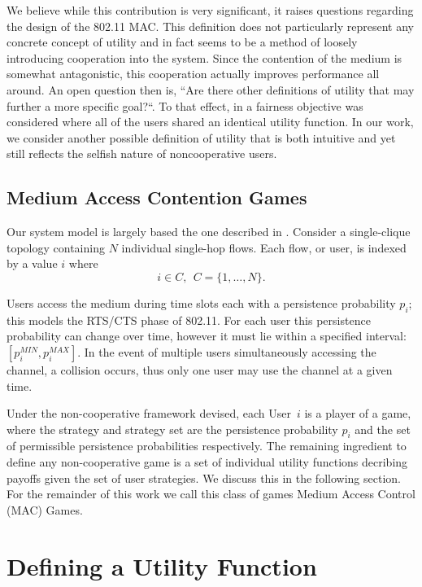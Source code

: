 \documentclass[conference]{IEEEtran}
\theoremstyle{definition}
\begin{document}
We believe while this contribution is very significant, it raises questions regarding the design of the 802.11 MAC. This definition does not particularly represent any concrete concept of utility and in fact seems to be a method of loosely introducing cooperation into the system. Since the contention of the medium is somewhat antagonistic, this cooperation actually improves performance all around. An open question then is, ``Are there other definitions of utility that may further a more specific goal?``. To that effect, in \cite{LCC07} a fairness objective was considered where all of the users shared an identical utility function. In our work, we consider another possible definition of utility that is both intuitive and yet still reflects the selfish nature of noncooperative users.

\subsection{Medium Access Contention Games}
Our system model is largely based the one described in \cite{LTHCC07}. Consider a single-clique topology containing $N$ individual single-hop flows. Each flow, or user, is indexed by a value $i$ where
\begin{equation}
	i \in C, \ \ C = \{1,\ldots,N\}.
\end{equation}

Users access the medium during time slots each with a persistence probability $p_i$; this models the RTS/CTS phase of 802.11. For each user this persistence probability can change over time, however it must lie within a specified interval: $[p_i^{MIN},p_i^{MAX}]$. In the event of multiple users simultaneously accessing the channel, a collision occurs, thus only one user may use the channel at a given time. 

Under the non-cooperative framework devised, each User~$i$ is a player of a game, where the strategy and strategy set are the persistence probability $p_i$ and the set of permissible persistence probabilities respectively. The remaining ingredient to define any non-cooperative game is a set of individual utility functions decribing payoffs given the set of user strategies. We discuss this in the following section. For the remainder of this work we call this class of games Medium Access Control (MAC) Games.


\section{Defining a Utility Function}
\end{document}
